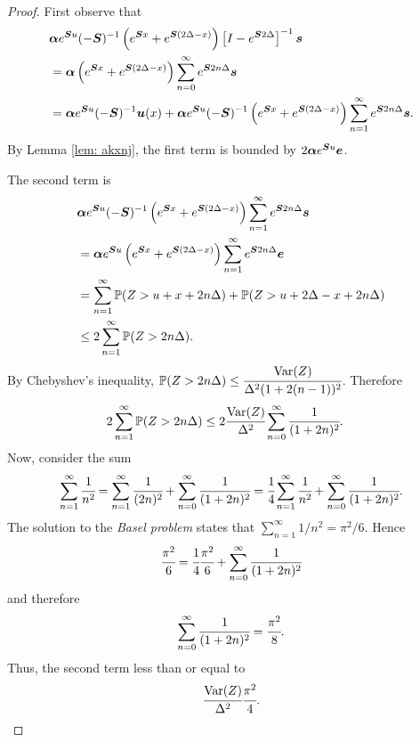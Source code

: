 \begin{proof}
	First observe that 
	\begin{align*}
		&\boldsymbol \alpha e^{\boldsymbol Su}(-\boldsymbol S)^{-1} \left(e^{\boldsymbol{S} x} + e^{\boldsymbol{S} (2\Delta-x)}\right)\left[I-e^{\boldsymbol S  2\Delta}\right]^{-1}\boldsymbol s 
		\\ &=\boldsymbol \alpha \left(e^{\boldsymbol{S} x} + e^{\boldsymbol{S} (2\Delta-x)}\right)\sum_{n=0}^\infty e^{\boldsymbol S  2n\Delta} \boldsymbol s 
		\\ &=\boldsymbol \alpha e^{\boldsymbol Su}(-\boldsymbol S)^{-1} \boldsymbol u(x) + \boldsymbol \alpha e^{\boldsymbol Su}(-\boldsymbol S)^{-1} \left(e^{\boldsymbol{S} x} + e^{\boldsymbol{S} (2\Delta-x)}\right)\sum_{n=1}^\infty e^{\boldsymbol S  2n\Delta} \boldsymbol s.
	\end{align*}
	By Lemma \ref{lem: akxnj}, the first term is bounded by \(2\boldsymbol \alpha e^{\boldsymbol S u}\boldsymbol e\). 
	
	The second term is 
	\begin{align*}
		&\boldsymbol \alpha e^{\boldsymbol Su}(-\boldsymbol S)^{-1} \left(e^{\boldsymbol{S} x} + e^{\boldsymbol{S} (2\Delta-x)}\right)\sum_{n=1}^\infty e^{\boldsymbol S  2n\Delta} \boldsymbol s
		\\&= \boldsymbol \alpha e^{\boldsymbol Su} \left(e^{\boldsymbol{S} x} + e^{\boldsymbol{S} (2\Delta-x)}\right)\sum_{n=1}^\infty e^{\boldsymbol S  2n\Delta} \boldsymbol e
		\\&=\sum_{n=1}^\infty \mathbb P(Z>u+x+2n\Delta) + \mathbb P(Z>u+2\Delta-x+2n\Delta)
		\\&\leq 2 \sum_{n=1}^\infty \mathbb P(Z>2n\Delta).
	\end{align*}
	By Chebyshev's inequality, \(\mathbb P(Z>2n\Delta)\leq \cfrac{\mathrm{Var}(Z)}{\Delta^2(1+2(n-1))^2}\). Therefore
	\begin{align}
		2 \sum_{n=1}^\infty \mathbb P(Z>2n\Delta)
		& \leq 2 \cfrac{\mathrm{Var}(Z)}{\Delta^2} \sum_{n=0}^\infty \cfrac{1}{(1+2n)^2}.
	\end{align}
	Now, consider the sum 
	\begin{align}
		\sum_{n=1}^\infty \cfrac{1}{n^2} = \sum_{n=1}^\infty \cfrac{1}{(2n)^2} + \sum_{n=0}^\infty \cfrac{1}{(1+2n)^2} = \cfrac{1}{4}\sum_{n=1}^\infty \cfrac{1}{n^2} + \sum_{n=0}^\infty \cfrac{1}{(1+2n)^2}.
	\end{align}
	The solution to the \emph{Basel problem} states that \(\displaystyle\sum_{n=1}^\infty 1/n^2=\pi^2/6.\) Hence 
	\[\cfrac{\pi^2}{6} = \cfrac{1}{4}\cfrac{\pi^2}{6} + \sum_{n=0}^\infty \cfrac{1}{(1+2n)^2}\]
	and therefore 
	\[\sum_{n=0}^\infty \cfrac{1}{(1+2n)^2} = \cfrac{\pi^2}{8}.\]
	Thus, the second term less than or equal to 
	\[\cfrac{\mathrm{Var}(Z)}{\Delta^2}\cfrac{\pi^2}{4}.\]
\end{proof}

